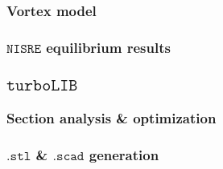 \subsubsection{Vortex model}
\subsubsection{$\mathtt{NISRE}$ equilibrium results}
\subsection{$\mathtt{turboLIB}$}
\subsubsection{Section analysis \& optimization}
\subsubsection{$\mathtt{.stl}$ \& $\mathtt{.scad}$ generation}


